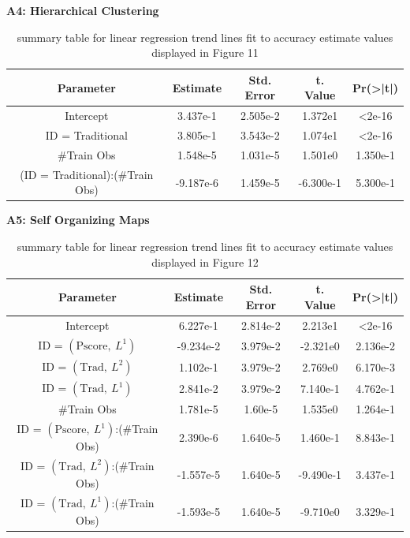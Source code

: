 \documentclass[12pt,]{article}
\begin{document}
\textbf{A4: Hierarchical Clustering}

\begin{table}[h!]
\begin{center}
\begin{tabular}{|c|c|c|c|c|}
\hline
Parameter                      & Estimate  & Std. Error & t. Value  & Pr(>|t|) \\
\hline
\hline
Intercept                      &  3.437e-1 &  2.505e-2  &  1.372e1  & <2e-16   \\
\hline
ID = Traditional               & 3.805e-1 &  3.543e-2  & 1.074e1  & <2e-16 \\
\hline
\#Train Obs                    &  1.548e-5 &  1.031e-5  &  1.501e0  & 1.350e-1 \\
\hline
(ID = Traditional):(\#Train Obs) &  -9.187e-6 &  1.459e-5  &  -6.300e-1 & 5.300e-1 \\
\hline
\end{tabular}
\end{center}
\caption[A4: Hierarchical Clustering Regression Summary Tables]{summary table for linear regression trend lines fit to accuracy estimate values displayed in Figure 11}
\end{table}

\textbf{A5: Self Organizing Maps}

\begin{table}[h!]
\begin{center}
\begin{tabular}{|c|c|c|c|c|}
\hline
Parameter     & Estimate  & Std. Error & t. Value  & Pr(>|t|) \\
\hline
\hline
Intercept    &  6.227e-1 &  2.814e-2  &  2.213e1  & <2e-16   \\
\hline
ID = $\left(\text{Pscore}, \ L^{1}  \right)$               & -9.234e-2 &  3.979e-2  & -2.321e0  & 2.136e-2 \\
\hline
ID = $\left(\text{Trad}, \ L^{2}   \right)$               & 1.102e-1 &  3.979e-2  & 2.769e0  & 6.170e-3 \\
\hline
ID = $\left(\text{Trad}, \ L^{1}   \right)$               & 2.841e-2 &  3.979e-2  & 7.140e-1  & 4.762e-1 \\
\hline
\#Train Obs  &  1.781e-5 &  1.60e-5  &  1.535e0  & 1.264e-1 \\
\hline
ID = $\left(\text{Pscore}, \ L^{1}  \right)$:(\#Train Obs) &  2.390e-6 &  1.640e-5  &  1.460e-1 & 8.843e-1 \\
\hline
ID = $\left(\text{Trad}, \ L^{2}   \right)$:(\#Train Obs) &  -1.557e-5 &  1.640e-5  &  -9.490e-1 & 3.437e-1 \\
\hline
ID = $\left(\text{Trad}, \ L^{1}   \right)$:(\#Train Obs) &  -1.593e-5 &  1.640e-5  &  -9.710e0 & 3.329e-1 \\
\hline
\end{tabular}
\end{center}
\caption[A5: Self Organizing Maps Regression Summary Tables]{summary table for linear regression trend lines fit to accuracy estimate values displayed in Figure 12}
\end{table}
\end{document}
